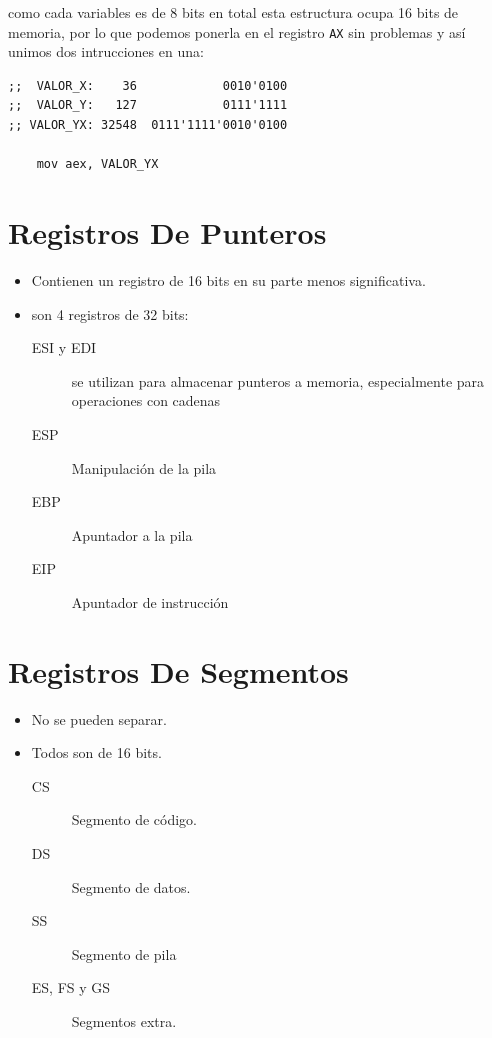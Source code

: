\documentclass[12pt]{article}
\begin{document}
como cada variables es de 8 bits en total esta estructura ocupa 16 bits de memoria, por lo que podemos ponerla en el registro \texttt{AX} sin problemas y así unimos dos intrucciones en una: 

\lstset{language=nasm,label= ,caption= ,captionpos=b,numbers=none,style=mystyle}
\begin{lstlisting}
;;  VALOR_X:    36            0010'0100
;;  VALOR_Y:   127            0111'1111
;; VALOR_YX: 32548  0111'1111'0010'0100

    mov aex, VALOR_YX
\end{lstlisting}

\section*{Registros De Punteros}
\label{sec:org34d843a}
\begin{itemize}
\item Contienen un registro de 16 bits en su parte menos significativa.
\item son 4 registros de 32 bits: 
\begin{description}
\item[{ESI y EDI}] se utilizan para almacenar punteros a memoria, especialmente para operaciones con cadenas
\item[{ESP}] Manipulación de la pila
\item[{EBP}] Apuntador a la pila
\item[{EIP}] Apuntador de instrucción
\end{description}
\end{itemize}

\section*{Registros De Segmentos}
\label{sec:org908bbfa}
\begin{itemize}
\item No se pueden separar.
\item Todos son de 16 bits.
\begin{description}
\item[{CS}] Segmento de código.
\item[{DS}] Segmento de datos.
\item[{SS}] Segmento de pila
\item[{ES, FS y GS}] Segmentos extra.
\end{description}
\end{itemize}
\end{document}
